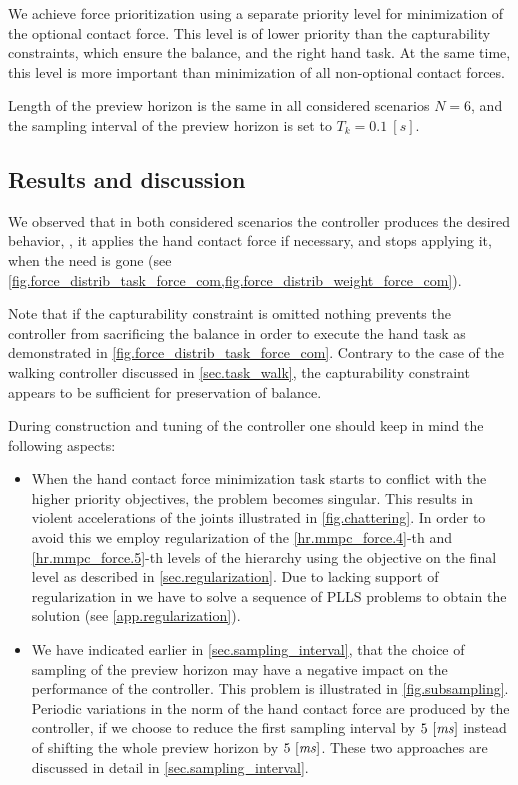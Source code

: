We achieve force prioritization using a separate priority level for
minimization of the optional contact force. This level is of lower priority
than the capturability constraints, which ensure the balance, and the right
hand task. At the same time, this level is more important than minimization of
all non-optional contact forces.


Length of the preview horizon is the same in all considered scenarios $N = 6$,
and the sampling interval of the preview horizon is set to $T_k = 0.1~[s]$.



\subsection{Results and discussion}\label{sec.force_results}

We observed that in both considered scenarios the controller produces the
desired behavior, \IE, it applies the hand contact force if necessary, and
stops applying it, when the need is gone (see
\cref{fig.force_distrib_task_force_com,fig.force_distrib_weight_force_com}).


Note that if the capturability constraint is omitted nothing prevents the
controller from sacrificing the balance in order to execute the hand task as
demonstrated in \cref{fig.force_distrib_task_force_com}. Contrary to the case
of the walking controller discussed in \cref{sec.task_walk}, the capturability
constraint appears to be sufficient for preservation of balance.


During construction and tuning of the controller one should keep in mind the
following aspects:
%
\begin{itemize}
    \item When the hand contact force minimization task starts to conflict with
        the higher priority objectives, the problem becomes singular. This
        results in violent accelerations of the joints illustrated in
        \cref{fig.chattering}. In order to avoid this we employ regularization
        of the \cref{hr.mmpc_force.4}-th and \cref{hr.mmpc_force.5}-th levels
        of the hierarchy using the objective on the final level as described in
        \cref{sec.regularization}. Due to lacking support of regularization in
         we have to solve a sequence of \ac{PLLS} problems to obtain
        the solution (see \cref{app.regularization}).

    \item We have indicated earlier in \cref{sec.sampling_interval}, that the
        choice of sampling of the preview horizon may have a negative impact on
        the performance of the controller. This problem is illustrated in
        \cref{fig.subsampling}. Periodic variations in the norm of the hand
        contact force are produced by the controller, if we choose to reduce
        the first sampling interval by $5~[\mathit{ms}]$ instead of shifting the
        whole preview horizon by $5~[\mathit{ms}]$. These two approaches are
        discussed in detail in \cref{sec.sampling_interval}.
\end{itemize}
%

